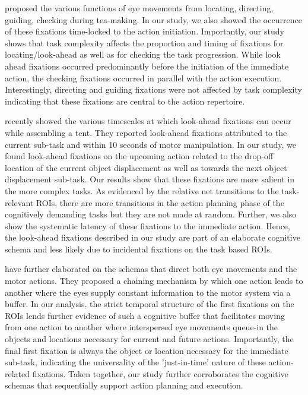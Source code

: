 \citet{Land1999-ol} proposed the various functions of eye movements from locating, directing, guiding, checking during tea-making. In our study, we also showed the occurrence of these fixations time-locked to the action initiation. Importantly, our study shows that task complexity affects the proportion and timing of fixations for locating/look-ahead as well as for checking the task progression. While look ahead fixations occurred predominantly before the initiation of the immediate action, the checking fixations occurred in parallel with the action execution. Interestingly, directing and guiding fixations were not affected by task complexity indicating that these fixations are central to the action repertoire.

\citet{Sullivan2021-ts} recently showed the various timescales at which look-ahead fixations can occur while assembling a tent. They reported look-ahead fixations attributed to the current sub-task and within 10 seconds of motor manipulation. In our study, we found look-ahead fixations on the upcoming  action related to the drop-off location of the current object displacement as well as towards the next object displacement sub-task. Our results show that these fixations are more salient in the more complex tasks. As evidenced by the relative net transitions to the task-relevant ROIs, there are more transitions in the action planning phase of the cognitively demanding tasks but they are not made at random. Further, we also show the systematic latency of these fixations to the immediate action.  Hence, the look-ahead fixations described in our study are part of an elaborate cognitive schema and less likely due to incidental fixations on the task based ROIs.

\citet{Land1997-ug} have further elaborated on the schemas that direct both eye movements and the motor actions. They proposed a chaining mechanism by which one action leads to another where the eyes supply constant information to the motor system via a buffer. In our analysis, the strict temporal structure of the first fixations on the ROIs lends further evidence of such a cognitive buffer that facilitates moving from one action to another where interspersed eye movements queue-in the objects and locations necessary for current and future actions. Importantly, the final first fixation is always the object or location necessary for the immediate sub-task, indicating the universality of the 'just-in-time' nature of these action-related fixations. Taken together, our study further corroborates the cognitive schemas that sequentially support action planning and execution.


